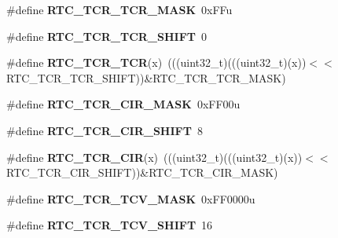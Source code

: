 \begin{DoxyCompactItemize}
\item 
\#define {\bfseries R\+T\+C\+\_\+\+T\+C\+R\+\_\+\+T\+C\+R\+\_\+\+M\+A\+SK}~0x\+F\+Fu\hypertarget{group__RTC__Register__Masks_ga48a96d1de8db1993bfac3ca9d6bdb227}{}\label{group__RTC__Register__Masks_ga48a96d1de8db1993bfac3ca9d6bdb227}

\item 
\#define {\bfseries R\+T\+C\+\_\+\+T\+C\+R\+\_\+\+T\+C\+R\+\_\+\+S\+H\+I\+FT}~0\hypertarget{group__RTC__Register__Masks_ga0d8bc8c79b8010b8ebb94562428713fe}{}\label{group__RTC__Register__Masks_ga0d8bc8c79b8010b8ebb94562428713fe}

\item 
\#define {\bfseries R\+T\+C\+\_\+\+T\+C\+R\+\_\+\+T\+CR}(x)~(((uint32\+\_\+t)(((uint32\+\_\+t)(x))$<$$<$R\+T\+C\+\_\+\+T\+C\+R\+\_\+\+T\+C\+R\+\_\+\+S\+H\+I\+FT))\&R\+T\+C\+\_\+\+T\+C\+R\+\_\+\+T\+C\+R\+\_\+\+M\+A\+SK)\hypertarget{group__RTC__Register__Masks_gaca21d09697f88aef5b056c81daaa8445}{}\label{group__RTC__Register__Masks_gaca21d09697f88aef5b056c81daaa8445}

\item 
\#define {\bfseries R\+T\+C\+\_\+\+T\+C\+R\+\_\+\+C\+I\+R\+\_\+\+M\+A\+SK}~0x\+F\+F00u\hypertarget{group__RTC__Register__Masks_ga8f198d1dbc7427e1dfabdc4e9f53f8e2}{}\label{group__RTC__Register__Masks_ga8f198d1dbc7427e1dfabdc4e9f53f8e2}

\item 
\#define {\bfseries R\+T\+C\+\_\+\+T\+C\+R\+\_\+\+C\+I\+R\+\_\+\+S\+H\+I\+FT}~8\hypertarget{group__RTC__Register__Masks_ga4b8c9ecf8ed798b8c0173ce122874c5e}{}\label{group__RTC__Register__Masks_ga4b8c9ecf8ed798b8c0173ce122874c5e}

\item 
\#define {\bfseries R\+T\+C\+\_\+\+T\+C\+R\+\_\+\+C\+IR}(x)~(((uint32\+\_\+t)(((uint32\+\_\+t)(x))$<$$<$R\+T\+C\+\_\+\+T\+C\+R\+\_\+\+C\+I\+R\+\_\+\+S\+H\+I\+FT))\&R\+T\+C\+\_\+\+T\+C\+R\+\_\+\+C\+I\+R\+\_\+\+M\+A\+SK)\hypertarget{group__RTC__Register__Masks_ga2425cc5a6f775938d0c0aa5448b96b05}{}\label{group__RTC__Register__Masks_ga2425cc5a6f775938d0c0aa5448b96b05}

\item 
\#define {\bfseries R\+T\+C\+\_\+\+T\+C\+R\+\_\+\+T\+C\+V\+\_\+\+M\+A\+SK}~0x\+F\+F0000u\hypertarget{group__RTC__Register__Masks_ga920f92da02ac0a6ae0931645600e2405}{}\label{group__RTC__Register__Masks_ga920f92da02ac0a6ae0931645600e2405}

\item 
\#define {\bfseries R\+T\+C\+\_\+\+T\+C\+R\+\_\+\+T\+C\+V\+\_\+\+S\+H\+I\+FT}~16\hypertarget{group__RTC__Register__Masks_ga6bcbafe57cdb430da5ee6902e0bcb224}{}\label{group__RTC__Register__Masks_ga6bcbafe57cdb430da5ee6902e0bcb224}


\end{DoxyCompactItemize}
